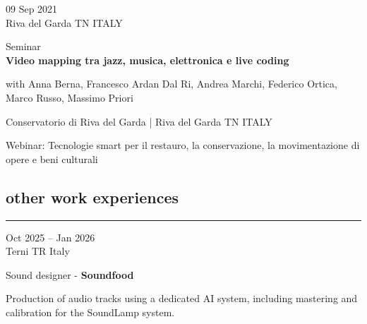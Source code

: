 \documentclass[7pt,a4paper]{article}
\begin{document}
\begin{mdframed}[
    backgroundcolor=entrygray,
    linecolor=entrygray,
    linewidth=0pt,
    innerleftmargin=6pt,
    innerrightmargin=6pt,
    innertopmargin=6pt,
    innerbottommargin=6pt,
    skipabove=0pt,
    skipbelow=0pt
]

\begin{minipage}[t]{0.28\textwidth}

09 Sep 2021
\\\scriptsize Riva del Garda TN ITALY

\end{minipage}
\begin{minipage}[t]{0.68\textwidth}
\small Seminar
\\\normalsize \textbf{Video mapping tra jazz, musica, elettronica e live coding}
\par \scriptsize with Anna Berna, Francesco Ardan Dal Ri, Andrea Marchi, Federico Ortica, Marco Russo, Massimo Priori
\par \small Conservatorio di Riva del Garda | \scriptsize Riva del Garda TN ITALY
\vspace{0.1cm}
\par \scriptsize Webinar: Tecnologie smart per il restauro, la conservazione, la movimentazione di opere e beni culturali
\end{minipage}
\vspace{0.25cm}
\end{mdframed}


\subsection*{other work experiences}
\normalsize
\vspace{-0.5cm}
\rule{\textwidth}{0.4pt}
\vspace{0.1cm}


\begin{mdframed}[
    backgroundcolor=entrygray,
    linecolor=entrygray,
    linewidth=0pt,
    innerleftmargin=6pt,
    innerrightmargin=6pt,
    innertopmargin=6pt,
    innerbottommargin=6pt,
    skipabove=0pt,
    skipbelow=0pt
]

\begin{minipage}[t]{0.28\textwidth}

Oct 2025 – Jan 2026
\\\scriptsize Terni TR Italy

\end{minipage}
\begin{minipage}[t]{0.68\textwidth}
Sound designer - \textbf{Soundfood}

\par \scriptsize Production of audio tracks using a dedicated AI system, including mastering and calibration for the SoundLamp system.

\vspace{0.25cm}
\end{minipage}
\end{mdframed}
\end{document}
